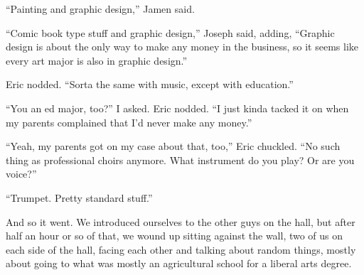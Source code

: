``Painting and graphic design,'' Jamen said.

``Comic book type stuff and graphic design,'' Joseph said, adding, ``Graphic design is about the only way to make any money in the business, so it seems like every art major is also in graphic design.''

Eric nodded.  ``Sorta the same with music, except with education.''

``You an ed major, too?'' I asked.  Eric nodded.  ``I just kinda tacked it on when my parents complained that I'd never make any money.''

``Yeah, my parents got on my case about that, too,'' Eric chuckled.  ``No such thing as professional choirs anymore.  What instrument do you play?  Or are you voice?''

``Trumpet.  Pretty standard stuff.''

And so it went.  We introduced ourselves to the other guys on the hall, but after half an hour or so of that, we wound up sitting against the wall, two of us on each side of the hall, facing each other and talking about random things, mostly about going to what was mostly an agricultural school for a liberal arts degree.
